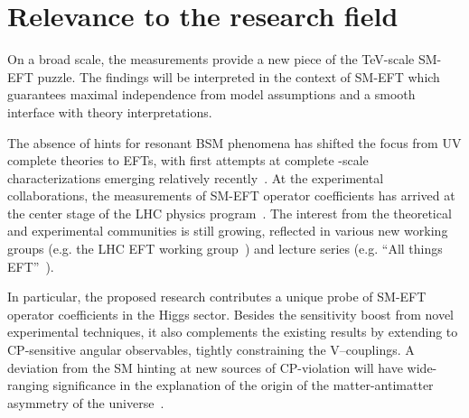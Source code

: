 \documentclass[a4paper,11pt]{article}
\renewcommand{\PV}{{{{V}}}\xspace}
\begin{document}
\section{Relevance to the research field}

On a broad scale, the measurements provide a new piece of the TeV-scale SM-EFT puzzle. 
The findings will be interpreted in the context of SM-EFT which guarantees maximal independence from model assumptions and a smooth interface with theory interpretations.  

The absence of hints for resonant BSM phenomena has shifted the focus from UV complete theories to EFTs, with first attempts at complete \TeV-scale characterizations emerging relatively recently~\cite{Ellis:2018gqa,Ellis:2020unq,Ethier:2021bye}.
At the experimental collaborations, the measurements of SM-EFT operator coefficients has arrived at the center stage of the LHC physics program~\cite{CMS:2021nnc,CMS:2021aly,CMS:2021gme}.
The interest from the theoretical and experimental communities is still growing, reflected in various new working groups (e.g. the  LHC EFT working group~\cite{LHC_EFT_WG}) and lecture series (e.g. ``All things EFT''~\cite{All_EFT}).



In particular, the proposed research contributes a unique probe of SM-EFT operator coefficients in the Higgs sector.
Besides the sensitivity boost from novel experimental techniques, it also complements the existing results by extending to CP-sensitive angular observables, tightly constraining the \PV--\PH couplings.
A deviation from the SM hinting at new sources of CP-violation will have wide-ranging significance in the explanation of the origin of the matter-antimatter asymmetry of the universe~\cite{Cohen:1997ac,Damgaard:2015con,Grzadkowski:2018nbc}.


\end{document}
